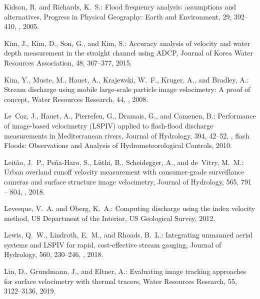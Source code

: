 \documentclass[hess, manuscript]{copernicus} %
\begin{document}
\begin{thebibliography}{68}
Kidson, R. and Richards, K.~S.: Flood frequency analysis: assumptions and
  alternatives, Progress in Physical Geography: Earth and Environment, 29,
  392--410, , 2005.

Kim, J., Kim, D., Son, G., and Kim, S.: Accuracy analysis of velocity and water
  depth measurement in the straight channel using ADCP, Journal of Korea Water
  Resources Association, 48, 367--377, 2015.

Kim, Y., Muste, M., Hauet, A., Krajewski, W.~F., Kruger, A., and Bradley, A.:
  Stream discharge using mobile large-scale particle image velocimetry: A proof
  of concept, Water Resources Research, 44, , 2008.

Le~Coz, J., Hauet, A., Pierrefeu, G., Dramais, G., and Camenen, B.: Performance
  of image-based velocimetry (LSPIV) applied to flash-flood discharge
  measurements in Mediterranean rivers, Journal of Hydrology, 394, 42--52,
  , flash Floods:
  Observations and Analysis of Hydrometeorological Controls, 2010.

Leitão, J.~P., Peña-Haro, S., Lüthi, B., Scheidegger, A., and de~Vitry,
  M.~M.: Urban overland runoff velocity measurement with consumer-grade
  surveillance cameras and surface structure image velocimetry, Journal of
  Hydrology, 565, 791 -- 804,
  , 2018.

Levesque, V.~A. and Oberg, K.~A.: Computing discharge using the index velocity
  method, US Department of the Interior, US Geological Survey, 2012.

Lewis, Q.~W., Lindroth, E.~M., and Rhoads, B.~L.: Integrating unmanned aerial
  systems and LSPIV for rapid, cost-effective stream gauging, Journal of
  Hydrology, 560, 230--246,
  , 2018.

Lin, D., Grundmann, J., and Eltner, A.: Evaluating image tracking approaches
  for surface velocimetry with thermal tracers, Water Resources Research, 55,
  3122--3136, 2019.


\end{thebibliography}
\end{document}
